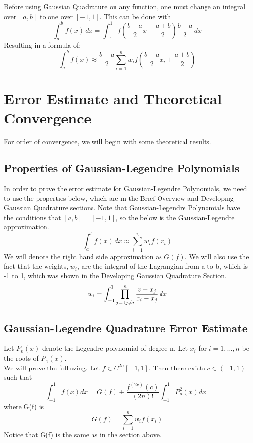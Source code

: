 \documentclass[12pt]{article}
\begin{document}
Before using Gaussian Quadrature on any function, one must change an integral over $[a,b]$ to one over $[-1,1]$. This can be done with
\begin{equation*}
	\int_{a}^{b} f(x) \,dx = \int_{-1}^{1}f \left(\frac{b-a}{2}x+\frac{a+b}{2}\right)\frac{b-a}{2} \,dx
\end{equation*}
Resulting in a formula of:
\begin{equation}
	\int_{a}^{b}f(x) \approx \frac{b-a}{2}\sum_{i=1}^{n}w_{i}f \left(\frac{b-a}{2}x_{i}+\frac{a+b}{2} \right)
\end{equation}

\section{Error Estimate and Theoretical Convergence}
For order of convergence, we will begin with some theoretical results.
\\
\subsection{Properties of Gaussian-Legendre Polynomials}

In order to prove the error estimate for Gaussian-Legendre Polynomials, we need to use the properties below, which are in the Brief Overview and Developing Gaussian Quadrature sections. Note that Gaussian-Legendre Polynomials have the conditions that $[a, b] = [-1, 1]$, so the below is the Gaussian-Legendre approximation.
\begin{equation}
    \int_a^b f(x) \, dx \approx \sum_{i=1}^n w_i f(x_i)
\end{equation}
We will denote the right hand side approximation as $G(f)$. 
We will also use the fact that the weights, $w_i$, are the integral of the Lagrangian from a to b, which is -1 to 1, which was shown in the Developing Gaussian Quadrature Section.
\begin{equation}
    w_{i}=\int_{-1}^{1}\prod_{{j=1 \\j \ne i}}^{n} \frac{x-x_{j}}{x_{i}-x_{j}}\,dx
\end{equation}


\subsection{Gaussian-Legendre Quadrature Error Estimate}

Let $P_n(x)$ denote the Legendre polynomial of degree n. Let $x_i$ for $i = 1,\dots,n$ be the roots of $P_n(x)$. \\
We will prove the following.
Let $f \in C^{2n}[-1,1]$. Then there exists $c \in (-1,1)$ such that
\begin{equation}
    \int_{-1}^{1} f(x)dx = G(f) + \frac{f^{(2n)}(c)}{(2n)!}\int_{-1}^{1} P_n^2(x)dx,
\end{equation}
where G(f) is
\begin{equation}
    G(f) = \sum_{i=1}^n w_i f(x_i)
\end{equation}
Notice that G(f) is the same as in the section above.
\end{document}
